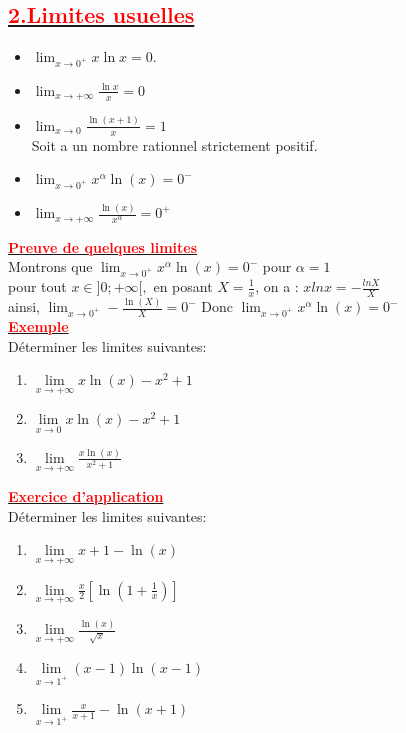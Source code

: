 \documentclass[12pt]{article}
\begin{document}
\subsection*{\underline{\textbf{\textcolor{red}{2.Limites usuelles}}}}
\begin{itemize}
    \item $\lim_{x \to 0^+} x \ln x = 0$.
    \item $ \lim_{x \to +\infty} \frac{\ln x}{x} = 0 $
    \item $\lim_{{x \to 0}} \frac{\ln(x+1)}{x}=1$\\
Soit a un nombre rationnel strictement positif.
   \item $\lim_{{x \to 0^+}} x^{\alpha}\ln(x) = 0^{-} $
   \item $\lim_{{x \to +\infty}} \frac{\ln(x)}{x^{\alpha}}=0^{+}$
\end{itemize}
\underline{\textbf{\textcolor{red}{Preuve de quelques limites}}}\\
Montrons que $\lim_{{x \to 0^+}} x^{\alpha}\ln(x) = 0^{-}$ pour $\alpha=1$\\
pour tout $x\in]0;+\infty[,$ en posant $X=\frac{1}{x}$, on a : $xlnx=-\frac{lnX}{X}$\\
ainsi, $\lim_{{x \to 0^{+}}} -\frac{\ln(X)}{X}=0^{-}$
Donc $\lim_{{x \to 0^+}} x^{\alpha}\ln(x) = 0^{-}$\\
\underline{\textbf{\textcolor{red}{Exemple}}}\\

Déterminer les limites suivantes:
\begin{enumerate}
\item \( \lim\limits_{x \to +\infty} x\ln(x)-x^{2}+1\)

\item \( \lim\limits_{x \to 0} x\ln(x)-x^{2}+1\)

\item \( \lim\limits_{x \to +\infty} \frac{x\ln(x)}{x^{2}+1}\)
\end{enumerate}

\underline{\textbf{\textcolor{red}{Exercice d'application}}}\\
Déterminer les limites suivantes:

\begin{enumerate}
\item \( \lim\limits_{x \to +\infty} x+1-\ln(x)\)

\item \( \lim\limits_{x \to +\infty} \frac{x}{2}[\ln(1+\frac{1}{x})] \)

\item \( \lim\limits_{x \to +\infty} \frac{\ln(x)}{\sqrt{x}} \)

\item \( \lim\limits_{x \to 1^{+}} (x-1)\ln(x-1) \)

\item \( \lim\limits_{x \to 1^{+}} \frac{x}{x+1}-\ln(x+1) \)
\end{enumerate}
\end{document}
